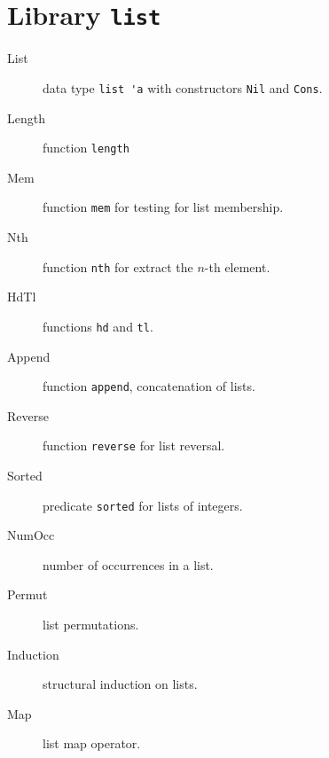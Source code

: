 \section{Library \texttt{list}}

\begin{description}
\item[List] data type \verb|list 'a| with constructors \verb|Nil| and
  \verb|Cons|.
\item[Length] function \verb|length|
\item[Mem] function \verb|mem| for testing for list membership.
\item[Nth] function \verb|nth| for extract the $n$-th element.
\item[HdTl] functions \verb|hd| and \verb|tl|.
\item[Append] function \verb|append|, concatenation of lists.
\item[Reverse] function \verb|reverse| for list reversal.
\item[Sorted] predicate \verb|sorted| for lists of integers.
\item[NumOcc] number of occurrences in a list.
\item[Permut] list permutations.
\item[Induction] structural induction on lists.
\item[Map] list map operator.
\end{description}





